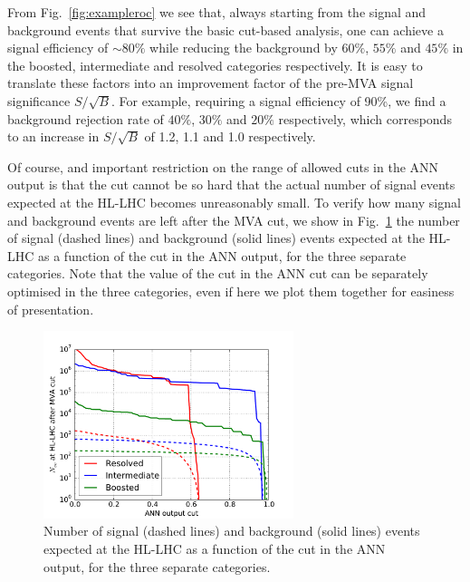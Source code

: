 From Fig.~\ref{fig:exampleroc} we see that, always starting from the signal
and background events that survive the basic cut-based analysis,
one can achieve a  signal
efficiency of $\sim 80\%$ while reducing the background by
$60\%$, $55\%$ and $45\%$ in the boosted, intermediate and resolved
categories respectively.
%
It is easy to translate these factors into an  improvement factor of the pre-MVA
signal significance $S/\sqrt{B}$.
%
For example, requiring a signal efficiency of 90\%, we find a background rejection
rate of $40\%$, $30\%$ and $20\%$ respectively, which corresponds to an increase
in $S/\sqrt{B}$ of 1.2, 1.1 and 1.0 respectively.

Of course, and important restriction on the range of allowed cuts in the ANN output
is that the cut cannot be so hard that the actual number of signal events expected
at the HL-LHC becomes unreasonably small.
%
To verify how many signal and background events are left after the MVA cut,
we show in Fig.~\ref{fig:nev2} the number of signal (dashed lines) and background (solid lines)
  events expected at the HL-LHC as a function of the cut in the ANN output,
  for the three separate categories.
  Note that the value of the cut in the ANN cut can be separately optimised in the three
  categories, even if here we plot them together for easiness of presentation.

\begin{figure}[t]
\begin{center}
\includegraphics[width=0.65\textwidth]{plots/nev2.pdf}
\caption{\small Number of signal (dashed lines) and background (solid lines)
  events expected at the HL-LHC as a function of the cut in the ANN output,
  for the three separate categories.
}
\label{fig:nev2}
\end{center}
\end{figure}

